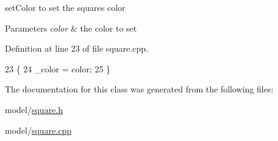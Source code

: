 set\+Color to set the square\textquotesingle{}s color 


\begin{DoxyParams}{Parameters}
{\em color} & the color to set \\
\hline
\end{DoxyParams}


Definition at line 23 of file square.\+cpp.


\begin{DoxyCode}
23                                 \{
24     \_color = color;
25 \}
\end{DoxyCode}


The documentation for this class was generated from the following files\+:\begin{DoxyCompactItemize}
\item 
model/\hyperlink{square_8h}{square.\+h}\item 
model/\hyperlink{square_8cpp}{square.\+cpp}\end{DoxyCompactItemize}
